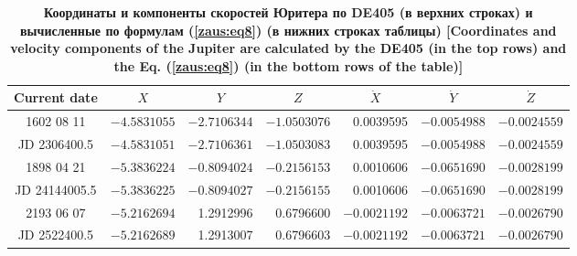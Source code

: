 \begin{table}
\begin{minipage}[t]{160mm}
\caption{\bf Координаты и компоненты скоростей Юритера по DE405 (в верхних строках) и вычисленные по формулам  (\ref{zaus:eq8}) (в нижних строках таблицы) [Coordinates and velocity components of the Jupiter are calculated by the  DE405 (in the top rows) and the Eq. (\ref{zaus:eq8}) (in the bottom rows of the table)]
\vspace{-3mm}}
\begin{tabular}{|c|r|r|r|r|r|r|}
\hline
\footnotesize
\rule{0mm}{12pt}%
Current date & \multicolumn{1}{c|}{\footnotesize $X$}&	\multicolumn{1}{c|}{\footnotesize $Y$}&	\multicolumn{1}{c|}{\footnotesize $Z$}&	\multicolumn{1}{c|}{\footnotesize $\dot{X}$}&	\multicolumn{1}{c|}{\footnotesize $\dot{Y}$}&	\multicolumn{1}{c|}{\footnotesize$\dot{Z}$}\\ \hline
\rule{0mm}{14pt}%
1602 08 11&	$-4.5831055$&	$-2.7106344$&	$-1.0503076$&	0.0039595&	$-0.0054988$&	  $-0.0024559$\\
JD 2306400.5&	$-4.5831051$&	$-2.7106361$&	$-1.0503083$&	0.0039595&	$-0.0054988$&	  $-0.0024559$\\ \hline
1898 04 21&	$-5.3836224$&	$-0.8094024$&	$-0.2156153$&	0.0010606&	$-0.0651690$&	 $-0.0028199$\\
JD 24144005.5& $-5.3836225$& $-0.8094027$& $-0.2156155$& 0.0010606& $-0.0651690$& $-0.0028199$\\ \hline
2193 06 07&	$-5.2162694$&	1.2912996&	0.6796600&	$-0.0021192$&	$-0.0063721$&	$-0.0026790$ \\
JD 2522400.5&	$-5.2162689$&	1.2913007&	0.6796603&	$-0.0021192$&	$-0.0063721$&	$-0.0026790$ \\ \hline
\end{tabular}
\label{table:zausaev:tabl9}
\end{minipage}


\end{table}




